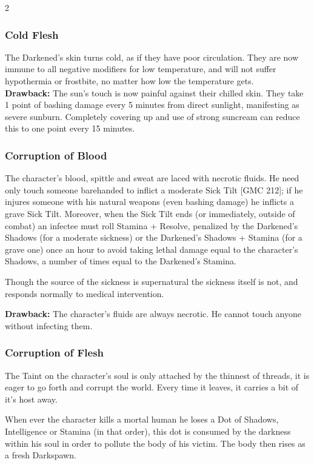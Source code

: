 \begin{multicols}{2}
\subsubsection*{Cold Flesh}
The Darkened’s skin turns cold, as if they have poor circulation. They are now immune to all negative modifiers for low temperature, and will not suffer hypothermia or frostbite, no matter how low the temperature gets. \\

\noindent \textbf{Drawback:} The sun’s touch is now painful against their chilled skin. They take 1 point of bashing damage every 5 minutes from direct sunlight, manifesting as severe sunburn. Completely covering up and use of strong suncream can reduce this to one point every 15 minutes. 

\subsubsection*{Corruption of Blood}

The character’s blood, spittle and sweat are laced with necrotic fluids. He need only touch someone barehanded to inflict a moderate Sick Tilt [GMC 212]; if he injures someone with his natural weapons (even bashing damage) he inflicts a grave Sick Tilt. Moreover, when the Sick Tilt ends (or immediately, outside of combat) an infectee must roll Stamina + Resolve, penalized by the Darkened’s Shadows (for a moderate sickness) or the Darkened's Shadows + Stamina (for a grave one) once an hour to avoid taking lethal damage equal to the character’s Shadows, a number of times equal to the Darkened's Stamina.

Though the source of the sickness is supernatural the sickness itself is not, and responds normally to medical intervention. 

\noindent \textbf{Drawback:} The character’s fluids are always necrotic. He cannot touch anyone without infecting them.

\subsubsection*{Corruption of Flesh}

The Taint on the character’s soul is only attached by the thinnest of threads, it is eager to go forth and corrupt the world. Every time it leaves, it carries a bit of it's host away. 

When ever the character kills a mortal human he loses a Dot of Shadows, Intelligence or Stamina (in that order), this dot is consumed by the darkness within his soul in order to pollute the body of his victim. The body then rises as a fresh Darkspawn. 


\end{multicols}
